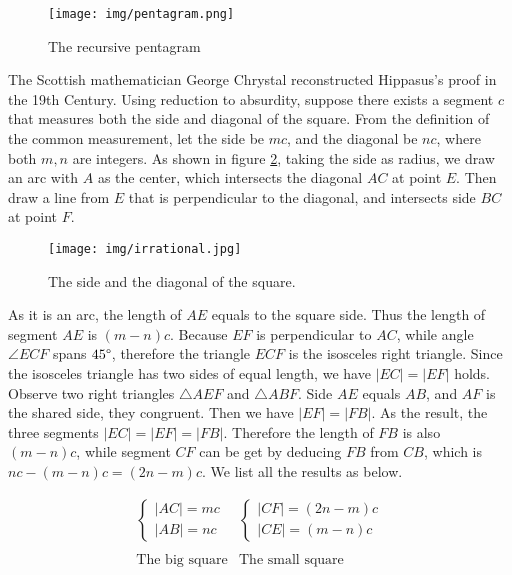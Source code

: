 \documentclass{article}
\begin{document}
\begin{figure}[htbp]
 \centering
 \texttt{[image: img/pentagram.png]}
 \caption{The recursive pentagram}
 \label{fig:pentagram}
\end{figure}

The Scottish mathematician George Chrystal reconstructed Hippasus's proof in the 19th Century. Using reduction to absurdity, suppose there exists a segment $c$ that measures both the side and diagonal of the square. From the definition of the common measurement, let the side be $mc$, and the diagonal be $nc$, where both $m, n$ are integers. As shown in figure \ref{fig:irrational}, taking the side as radius, we draw an arc with $A$ as the center, which intersects the diagonal $AC$ at point $E$. Then draw a line from $E$ that is perpendicular to the diagonal, and intersects side $BC$ at point $F$.

\begin{figure}[htbp]
 \centering
 \texttt{[image: img/irrational.jpg]}
 \caption{The side and the diagonal of the square.}
 \label{fig:irrational}
\end{figure}

As it is an arc, the length of $AE$ equals to the square side. Thus the length of segment $AE$ is $(m - n)c$. Because $EF$ is perpendicular to $AC$, while angle $\angle ECF$ spans $45\degree$, therefore the triangle $ECF$ is the isosceles right triangle. Since the isosceles triangle has two sides of equal length, we have $|EC| = |EF|$ holds. Observe two right triangles $\triangle AEF$ and $\triangle ABF$. Side $AE$ equals $AB$, and $AF$ is the shared side, they congruent. Then we have $|EF| = |FB|$. As the result, the three segments $|EC| = |EF| = |FB|$. Therefore the length of $FB$ is also $(m - n)c$, while segment $CF$ can be get by deducing $FB$ from $CB$, which is $nc - (m - n)c = (2n - m)c$. We list all the results as below.

\[
\begin{array}{c|c}
\begin{cases}
|AC| = mc \\
|AB| = nc
\end{cases} &
\begin{cases}
|CF| = (2n - m)c \\
|CE| = (m - n)c
\end{cases} \\[4ex]
\\
\text{The big square} & \text{The small square}
\end{array}
\]
\end{document}
